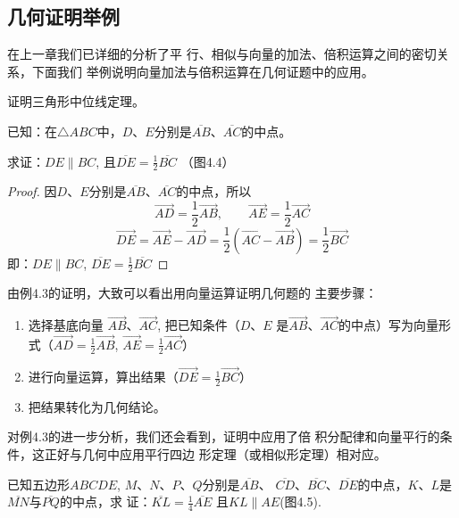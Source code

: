 \subsection{几何证明举例}
 在上一章我们已详细的分析了平
行、相似与向量的加法、倍积运算之间的密切关系，下面我们
举例说明向量加法与倍积运算在几何证题中的应用。


\begin{example}
    证明三角形中位线定理。

已知：在$\triangle ABC$中，$D$、$E$分别是$\overline{AB}$、$\overline{AC}$的中点。

求证：$DE\parallel BC$, 且$\overline{DE}=\frac{1}{2}\overline{BC}$ （图4.4）
\end{example}

\begin{figure}[htp]
    \centering
{}
    \caption{}
\end{figure}

\begin{proof}
    因$D$、$E$分别是$\overline{AB}$、$\overline{AC}$的中点，所以
\[\Vec{AD}=\frac{1}{2} \Vec{AB},\qquad \Vec{AE}=\frac{1}{2}\Vec{AC}\]
\[\Vec{DE}=\Vec{AE}-\Vec{AD}=\frac{1}{2}\left(\Vec{AC}-\Vec{AB}\right)=\frac{1}{2}\Vec{BC}\]
即：$DE\parallel BC$,  $\overline{DE}=\frac{1}{2}\overline{BC}$
\end{proof}

由例4.3的证明，大致可以看出用向量运算证明几何题的
主要步骤：
\begin{enumerate}
\item 选择基底向量
$\Vec{AB}$、$\Vec{AC}$, 
把已知条件（$D$、$E$
是$\Vec{AB}$、$\Vec{AC}$的中点）写为向量形式（$\Vec{AD}=\frac{1}{2}\Vec{AB}$, $\Vec{AE}=\frac{1}{2}\Vec{AC}$）
\item 进行向量运算，算出结果（$\Vec{DE}=\frac{1}{2}\Vec{BC}$）
\item 把结果转化为几何结论。
\end{enumerate}

对例4.3的进一步分析，我们还会看到，证明中应用了倍
积分配律和向量平行的条件，这正好与几何中应用平行四边
形定理（或相似形定理）相对应。

\begin{example}
 已知五边形$ABCDE$, $M$、$N$、$P$、$Q$分别是$\overline{AB}$、
 $\overline{CD}$、$\overline{BC}$、$\overline{DE}$的中点，$K$、$L$是$\overline{MN}$与$\overline{PQ}$的中点，求
证：$\overline{KL}=\frac{1}{4}\overline{AE}$ 且$KL\parallel AE$(图4.5).
\end{example}

